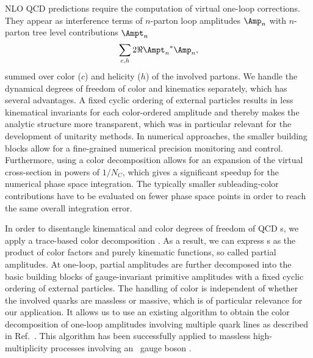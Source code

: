 NLO QCD predictions require the computation of virtual one-loop corrections. They appear as interference terms of
$n$-parton loop amplitudes $\Amp_n$ with $n$-parton tree level contributions $\Ampt_n$
\begin{align}\label{eq:interference}
 \sum_{c,h}2 \Re{{\Ampt_n}^*\Amp_n},
\end{align}
summed over color ($c$) and helicity ($h$) of the involved partons. We handle the dynamical
degrees of freedom of color and kinematics separately, which has several
advantages. A fixed cyclic ordering of external particles results in less
kinematical invariants for each color-ordered amplitude and thereby
makes the analytic structure more transparent, which was in particular
relevant for the development of
unitarity methods. In numerical
approaches, the smaller building blocks allow for a fine-grained
numerical precision monitoring and control. Furthermore, using a color decomposition allows for an
expansion of the virtual cross-section in powers of $1/N_C$, which gives a significant speedup for
the numerical phase space integration. The typically smaller subleading-color
contributions have to be evaluated on fewer phase space points in
order to reach the same overall integration error. 

In order to disentangle kinematical and color degrees of freedom of
QCD \ola s,
we apply a trace-based color decomposition \cite{Mangano1991}. As a
result, we can express \ola s as the
product of color factors and purely kinematic functions, so called
partial amplitudes. At one-loop, partial amplitudes are further
decomposed into the basic building blocks of gauge-invariant primitive amplitudes \cite{Bern1995b,Bern:1997sc} with a fixed
cyclic ordering of external particles. The handling of
color is independent of whether the involved quarks are massless or
massive, which is of particular relevance for our application. It allows us to use an existing algorithm to obtain the color
decomposition of one-loop amplitudes involving multiple quark lines as
described in Ref.~\cite{Ita:2011ar}. This algorithm has been successfully applied to massless
high-multiplicity processes involving an \ew~gauge boson \cite{BH:W4j,BH:W5j,BH:Z4j}.

